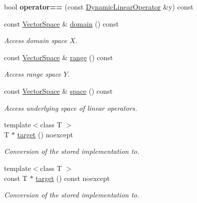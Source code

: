 \begin{DoxyCompactItemize}
\item 
\hypertarget{classSpacy_1_1DynamicLinearOperator_a8f252aa5f13f636533d6f4337c4116d0}{bool {\bfseries operator==} (const \hyperlink{classSpacy_1_1DynamicLinearOperator}{\-Dynamic\-Linear\-Operator} \&y) const }\label{classSpacy_1_1DynamicLinearOperator_a8f252aa5f13f636533d6f4337c4116d0}

\item 
\hypertarget{classSpacy_1_1DynamicLinearOperator_aa5882565e1a88f20a16f7e7a27df3015}{const \hyperlink{classSpacy_1_1VectorSpace}{\-Vector\-Space} \& \hyperlink{classSpacy_1_1DynamicLinearOperator_aa5882565e1a88f20a16f7e7a27df3015}{domain} () const }\label{classSpacy_1_1DynamicLinearOperator_aa5882565e1a88f20a16f7e7a27df3015}

\begin{DoxyCompactList}\small\item\em \-Access domain space $X$. \end{DoxyCompactList}\item 
\hypertarget{classSpacy_1_1DynamicLinearOperator_a08e5f8bd41f1112ae349e50dd773b9ea}{const \hyperlink{classSpacy_1_1VectorSpace}{\-Vector\-Space} \& \hyperlink{classSpacy_1_1DynamicLinearOperator_a08e5f8bd41f1112ae349e50dd773b9ea}{range} () const }\label{classSpacy_1_1DynamicLinearOperator_a08e5f8bd41f1112ae349e50dd773b9ea}

\begin{DoxyCompactList}\small\item\em \-Access range space $Y$. \end{DoxyCompactList}\item 
\hypertarget{classSpacy_1_1DynamicLinearOperator_afde64039ceab0ad8752bce3ac2187a41}{const \hyperlink{classSpacy_1_1VectorSpace}{\-Vector\-Space} \& \hyperlink{classSpacy_1_1DynamicLinearOperator_afde64039ceab0ad8752bce3ac2187a41}{space} () const }\label{classSpacy_1_1DynamicLinearOperator_afde64039ceab0ad8752bce3ac2187a41}

\begin{DoxyCompactList}\small\item\em \-Access underlying space of linear operators. \end{DoxyCompactList}\item 
{\footnotesize template$<$class T $>$ }\\\-T $\ast$ \hyperlink{classSpacy_1_1DynamicLinearOperator_a5574c61e31ef28d9d1660dd69fc31810}{target} () noexcept
\begin{DoxyCompactList}\small\item\em \-Conversion of the stored implementation to. \end{DoxyCompactList}\item 
{\footnotesize template$<$class T $>$ }\\const \-T $\ast$ \hyperlink{classSpacy_1_1DynamicLinearOperator_a1bb194c6f220a136916f661314f543ae}{target} () const noexcept
\begin{DoxyCompactList}\small\item\em \-Conversion of the stored implementation to. \end{DoxyCompactList}\end{DoxyCompactItemize}

